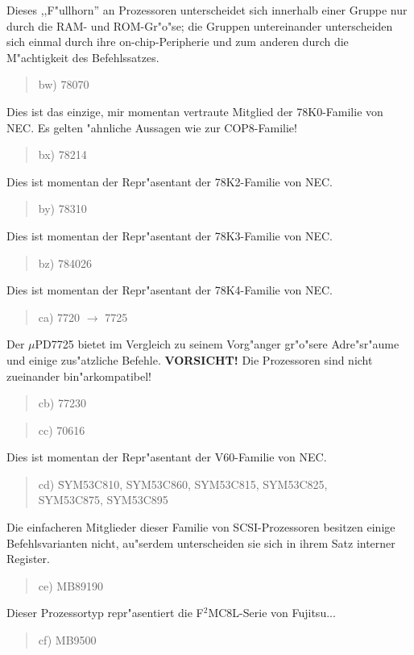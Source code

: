 \documentclass[12pt,a4paper,twoside]{report}
\begin{document}
Dieses ,,F"ullhorn'' an Prozessoren unterscheidet sich innerhalb einer
Gruppe nur durch die RAM- und ROM-Gr"o"se; die Gruppen untereinander
unterscheiden sich einmal durch ihre on-chip-Peripherie und
zum anderen durch die M"achtigkeit des Befehlssatzes.
\begin{quote}
bw) 78070
\end{quote}
Dies ist das einzige, mir momentan vertraute Mitglied der
78K0-Familie von NEC.  Es gelten "ahnliche Aussagen wie zur
COP8-Familie!
\begin{quote}
bx) 78214
\end{quote}
Dies ist momentan der Repr"asentant der 78K2-Familie von NEC.
\begin{quote}
by) 78310
\end{quote}
Dies ist momentan der Repr"asentant der 78K3-Familie von NEC.
\begin{quote}
bz) 784026
\end{quote}
Dies ist momentan der Repr"asentant der 78K4-Familie von NEC.
\begin{quote}
ca) 7720 $\rightarrow$ 7725
\end{quote}
Der $\mu$PD7725 bietet im Vergleich zu seinem Vorg"anger gr"o"sere
Adre"sr"aume und einige zus"atzliche Befehle. {\bf VORSICHT!}  Die
Prozessoren sind nicht zueinander bin"arkompatibel!
\begin{quote}
cb) 77230
\end{quote}
\begin{quote}
cc) 70616
\end{quote}
Dies ist momentan der Repr"asentant der V60-Familie von NEC.
\begin{quote}
\begin{tabbing}
cd) \= SYM53C810, SYM53C860, SYM53C815, SYM53C825, \\
    \> SYM53C875, SYM53C895
\end{tabbing}
\end{quote}
Die einfacheren Mitglieder dieser Familie von SCSI-Prozessoren besitzen
einige Befehlsvarianten nicht, au"serdem unterscheiden sie sich in ihrem
Satz interner Register.
\begin{quote}
ce) MB89190
\end{quote}
Dieser Prozessortyp repr"asentiert die F$^{2}$MC8L-Serie von Fujitsu...
\begin{quote}
cf) MB9500
\end{quote}
\end{document}
